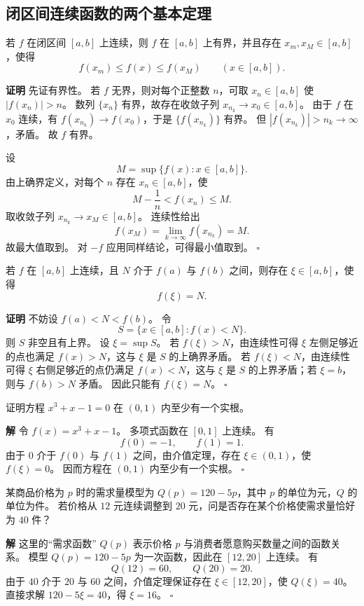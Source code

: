 \documentclass[fontset=fandol]{ctexart}
\newenvironment{proofdetail}{\par\noindent\textbf{证明}\quad}{\hfill$\square$\par\vspace{0.8em}}
\newenvironment{solution}{\par\noindent\textbf{解}\quad}{\hfill$\square$\par\vspace{0.8em}}
\begin{document}
\subsection*{闭区间连续函数的两个基本定理}

\begin{theorem}[有界性与最值定理]
若 $f$ 在闭区间 $[a,b]$ 上连续，则 $f$ 在 $[a,b]$ 上有界，并且存在 $x_m,x_M\in[a,b]$，使得
\[
f(x_m)\le f(x)\le f(x_M)\qquad (x\in[a,b]).
\]
\end{theorem}
\begin{proofdetail}
先证有界性。 若 $f$ 无界，则对每个正整数 $n$，可取 $x_n\in[a,b]$ 使 $|f(x_n)|>n$。 数列 $\{x_n\}$ 有界，故存在收敛子列 $x_{n_k}\to x_0\in[a,b]$。 由于 $f$ 在 $x_0$ 连续，有 $f(x_{n_k})\to f(x_0)$，于是 $\{f(x_{n_k})\}$ 有界。 但 $|f(x_{n_k})|>n_k\to\infty$，矛盾。 故 $f$ 有界。

设
\[
M=\sup\{f(x):x\in[a,b]\}.
\]
由上确界定义，对每个 $n$ 存在 $x_n\in[a,b]$，使
\[
M-\frac1n<f(x_n)\le M.
\]
取收敛子列 $x_{n_k}\to x_M\in[a,b]$。 连续性给出
\[
f(x_M)=\lim_{k\to\infty}f(x_{n_k})=M.
\]
故最大值取到。 对 $-f$ 应用同样结论，可得最小值取到。
\end{proofdetail}

\begin{theorem}[介值定理]
若 $f$ 在 $[a,b]$ 上连续，且 $N$ 介于 $f(a)$ 与 $f(b)$ 之间，则存在 $\xi\in[a,b]$，使得
\[
f(\xi)=N.
\]
\end{theorem}
\begin{proofdetail}
不妨设 $f(a)<N<f(b)$。 令
\[
S=\{x\in[a,b]:f(x)<N\}.
\]
则 $S$ 非空且有上界。 设 $\xi=\sup S$。 若 $f(\xi)>N$，由连续性可得 $\xi$ 左侧足够近的点也满足 $f(x)>N$，这与 $\xi$ 是 $S$ 的上确界矛盾。 若 $f(\xi)<N$，由连续性可得 $\xi$ 右侧足够近的点仍满足 $f(x)<N$，这与 $\xi$ 是 $S$ 的上界矛盾；若 $\xi=b$，则与 $f(b)>N$ 矛盾。 因此只能有 $f(\xi)=N$。
\end{proofdetail}

\begin{example}
证明方程 $x^3+x-1=0$ 在 $(0,1)$ 内至少有一个实根。
\end{example}
\begin{solution}
令 $f(x)=x^3+x-1$。 多项式函数在 $[0,1]$ 上连续。 有
\[
f(0)=-1,\qquad f(1)=1.
\]
由于 $0$ 介于 $f(0)$ 与 $f(1)$ 之间，由介值定理，存在 $\xi\in(0,1)$，使 $f(\xi)=0$。 因而方程在 $(0,1)$ 内至少有一个实根。
\end{solution}

\begin{example}
某商品价格为 $p$ 时的需求量模型为 $Q(p)=120-5p$，其中 $p$ 的单位为元，$Q$ 的单位为件。 若价格从 $12$ 元连续调整到 $20$ 元，问是否存在某个价格使需求量恰好为 $40$ 件？
\end{example}
\begin{solution}
这里的“需求函数” $Q(p)$ 表示价格 $p$ 与消费者愿意购买数量之间的函数关系。 模型 $Q(p)=120-5p$ 为一次函数，因此在 $[12,20]$ 上连续。 有
\[
Q(12)=60,\qquad Q(20)=20.
\]
由于 $40$ 介于 $20$ 与 $60$ 之间，介值定理保证存在 $\xi\in[12,20]$，使 $Q(\xi)=40$。 直接求解 $120-5\xi=40$，得 $\xi=16$。
\end{solution}
\end{document}
